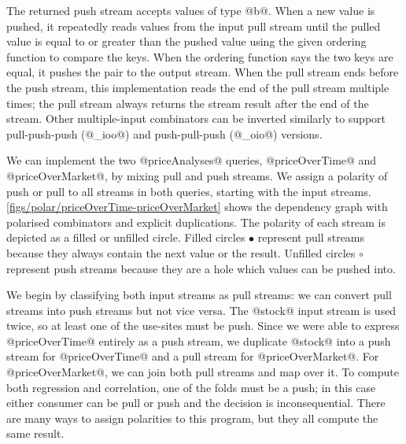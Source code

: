 The returned push stream accepts values of type @b@.
When a new value is pushed, it repeatedly reads values from the input pull stream until the pulled value is equal to or greater than the pushed value using the given ordering function to compare the keys.
When the ordering function says the two keys are equal, it pushes the pair to the output stream.
When the pull stream ends before the push stream, this implementation reads the end of the pull stream multiple times; the pull stream always returns the stream result after the end of the stream.
Other multiple-input combinators can be inverted similarly to support pull-push-push (@_ioo@) and push-pull-push (@_oio@) versions.

We can implement the two @priceAnalyses@ queries, @priceOverTime@ and @priceOverMarket@, by mixing pull and push streams.
We assign a polarity of push or pull to all streams in both queries, starting with the input streams.
\autoref{figs/polar/priceOverTime-priceOverMarket} shows the dependency graph with polarised combinators and explicit duplications.
The polarity of each stream is depicted as a filled or unfilled circle.
Filled circles $\bullet$ represent pull streams because they always contain the next value or the result.
Unfilled circles $\circ$ represent push streams because they are a hole which values can be pushed into.

We begin by classifying both input streams as pull streams: we can convert pull streams into push streams but not vice versa.
The @stock@ input stream is used twice, so at least one of the use-sites must be push.
Since we were able to express @priceOverTime@ entirely as a push stream, we duplicate @stock@ into a push stream for @priceOverTime@ and a pull stream for @priceOverMarket@.
For @priceOverMarket@, we can join both pull streams and map over it.
To compute both regression and correlation, one of the folds must be a push; in this case either consumer can be pull or push and the decision is inconsequential.
There are many ways to assign polarities to this program, but they all compute the same result.

